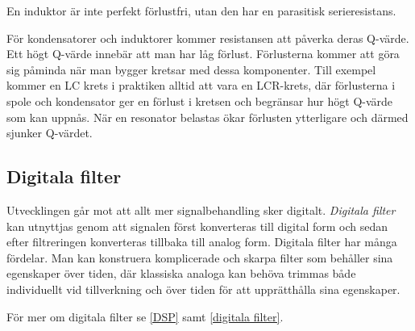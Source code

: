 En induktor är inte perfekt förlustfri, utan den har en parasitisk serieresistans.

För kondensatorer och induktorer kommer resistansen att påverka deras Q-värde. 
Ett högt Q-värde innebär att man har låg förlust.
Förlusterna kommer att göra sig påminda när man bygger kretsar med dessa
komponenter. Till exempel kommer en LC krets i praktiken alltid att vara en LCR-krets, där
förlusterna i spole och kondensator ger en förlust i kretsen och begränsar hur högt Q-värde som kan uppnås.
När en resonator belastas ökar förlusten ytterligare och därmed sjunker Q-värdet.

\subsection{Digitala filter}

Utvecklingen går mot att allt mer signalbehandling sker digitalt. 
\emph{Digitala filter} kan utnyttjas genom att signalen först konverteras till
digital form och sedan efter filtreringen konverteras tillbaka till analog form.
Digitala filter har många fördelar. Man kan konstruera komplicerade och skarpa
filter som behåller sina egenskaper över tiden, där klassiska analoga kan behöva
trimmas både individuellt vid tillverkning och över tiden för att upprätthålla
sina egenskaper.

För mer om digitala filter se \ref{DSP} samt \ref{digitala filter}.
